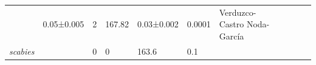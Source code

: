 \documentclass[12pt,twoside]{reedthesis}
\begin{document}
\begin{longtable}[]{@{}lllllllllll@{}}
\begin{minipage}[t]{0.06\columnwidth}
  \end{minipage} & \begin{minipage}[t]{0.06\columnwidth}\raggedright\strut
  0.05±0.005\strut
  \end{minipage} & \begin{minipage}[t]{0.06\columnwidth}\raggedright\strut
  2\strut
  \end{minipage} & \begin{minipage}[t]{0.05\columnwidth}\raggedright\strut
  167.82\strut
  \end{minipage} & \begin{minipage}[t]{0.05\columnwidth}\raggedright\strut
  0.03±0.002\strut
  \end{minipage} & \begin{minipage}[t]{0.03\columnwidth}\raggedright\strut
  0.0001\strut
  \end{minipage} & \begin{minipage}[t]{0.11\columnwidth}\raggedright\strut
  Verduzco-Castro Noda-García\strut
  \end{minipage}\tabularnewline
  \begin{minipage}[t]{0.15\columnwidth}\raggedright\strut
  \emph{scabies}\strut
  \end{minipage} & \begin{minipage}[t]{0.05\columnwidth}\raggedright\strut
  \strut
  \end{minipage} & \begin{minipage}[t]{0.04\columnwidth}\raggedright\strut
  0\strut
  \end{minipage} & \begin{minipage}[t]{0.04\columnwidth}\raggedright\strut
  0\strut
  \end{minipage} & \begin{minipage}[t]{0.06\columnwidth}\raggedright\strut
  163.6\strut
  \end{minipage} & \begin{minipage}[t]{0.06\columnwidth}\raggedright\strut
  0.1\strut
  \end{minipage} & \begin{minipage}[t]{0.06\columnwidth}\raggedright\strut
  \strut
  \end{minipage} & \begin{minipage}[t]{0.05\columnwidth}\raggedright\strut
  \strut
  \end{minipage} & \begin{minipage}[t]{0.05\columnwidth}\raggedright\strut
  \strut
  \end{minipage} & \begin{minipage}[t]{0.03\columnwidth}\raggedright\strut

\end{minipage}
\end{longtable}
\end{document}
